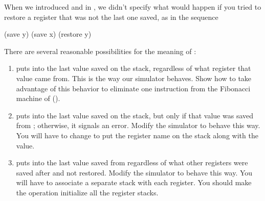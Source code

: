 \begin{exercise}
	\label{Exercise 5.11}
	When we introduced  and  in , we didn’t specify what would happen if you tried to restore a register that was not the last one saved, as in the sequence
	\begin{scheme}
	  (save y)  (save x)  (restore y)
	\end{scheme}
	There are several reasonable possibilities for the meaning of :
	\begin{enumerate}[label = \alph*., leftmargin = *]

		\item
			 puts into  the last value saved on the stack, regardless of what register that value came from.
			This is the way our simulator behaves.
			Show how to take advantage of this behavior to eliminate one instruction from the Fibonacci machine of  ().

		\item
			 puts into  the last value saved on the stack, but only if that value was saved from ;
			otherwise, it signals an error.
			Modify the simulator to behave this way.
			You will have to change   to put the register name on the stack along with the value.

		\item
			 puts into  the last value saved from  regardless of what other registers were saved after  and not restored.
			Modify the simulator to behave this way.
			You will have to associate a separate stack with each register.
			You should make the  operation initialize all the register stacks.

	\end{enumerate}
\end{exercise}



